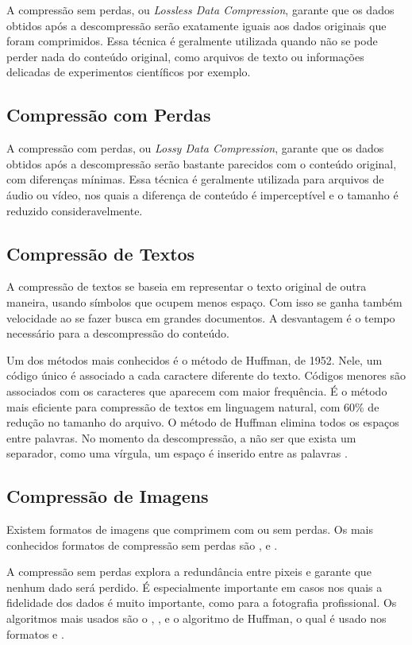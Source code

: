 A compressão sem perdas, ou \textit{Lossless Data Compression}, garante que os dados obtidos após a descompressão serão exatamente iguais aos dados originais que foram comprimidos. Essa técnica é geralmente utilizada quando não se pode perder nada do conteúdo original, como arquivos de texto ou informações delicadas de experimentos científicos por exemplo.

\subsection{Compressão com Perdas}

A compressão com perdas, ou \textit{Lossy Data Compression}, garante que os dados obtidos após a descompressão serão bastante parecidos com o conteúdo original, com diferenças mínimas. Essa técnica é geralmente utilizada para arquivos de áudio ou vídeo, nos quais a diferença de conteúdo é imperceptível e o tamanho é reduzido consideravelmente.

\subsection{Compressão de Textos}

A compressão de textos se baseia em representar o texto original de outra maneira, usando símbolos que ocupem menos espaço. Com isso se ganha também velocidade ao se fazer busca em grandes documentos. A desvantagem é o tempo necessário para a descompressão do conteúdo.

Um dos métodos mais conhecidos é o método de Huffman, de 1952. Nele, um código único é associado a cada caractere diferente do texto. Códigos menores são associados com os caracteres que aparecem com maior frequência. É o método mais eficiente para compressão de textos em linguagem natural, com 60\% de redução no tamanho do arquivo. O método de Huffman elimina todos os espaços entre palavras. No momento da descompressão, a não ser que exista um separador, como uma vírgula, um espaço é inserido entre as palavras \cite{Salomon2007}.

\subsection{Compressão de Imagens}

Existem formatos de imagens que comprimem com ou sem perdas. Os mais conhecidos formatos de compressão sem perdas são \png, \jpegg e \tiff.

A compressão sem perdas explora a redundância entre pixeis e garante que nenhum dado será perdido. É especialmente importante em casos nos quais a fidelidade dos dados é muito importante, como para a fotografia profissional. Os algoritmos mais usados são o \rle, \lz, \lzw e o algoritmo de Huffman, o qual é usado nos formatos \png e \tiff.


